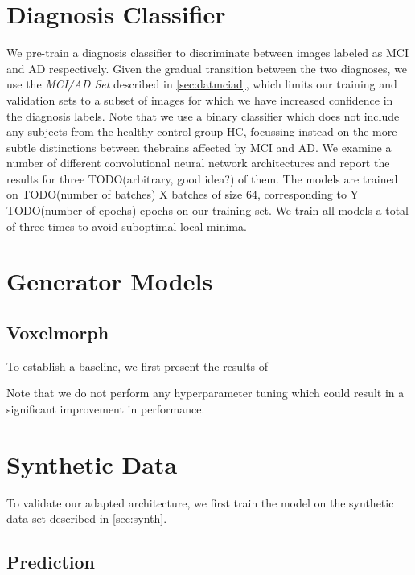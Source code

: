 \section{Diagnosis Classifier}
We pre-train a diagnosis classifier to discriminate between images labeled as MCI and AD respectively. Given the gradual transition between the two diagnoses, we use the \textit{MCI/AD Set} described in \autoref{sec:datmciad}, which limits our training and validation sets to a subset of images for which we have increased confidence in the diagnosis labels. Note that we use a binary classifier which does not include any subjects from the healthy control group HC, focussing instead on the more subtle distinctions between thebrains affected by MCI and AD. We examine a number of different convolutional neural network architectures and report the results for three TODO(arbitrary, good idea?) of them. The models are trained on TODO(number of batches) X batches of size 64, corresponding to Y TODO(number of epochs) epochs on our training set. We train all models a total of three times to avoid suboptimal local minima.

\section{Generator Models}

\subsection{Voxelmorph}
To establish a baseline, we first present the results of 

Note that we do not perform any hyperparameter tuning which could result in a significant improvement in performance.

\section{Synthetic Data}
To validate our adapted architecture, we first train the model on the synthetic data set described in \autoref{sec:synth}.


\subsection{Prediction}

